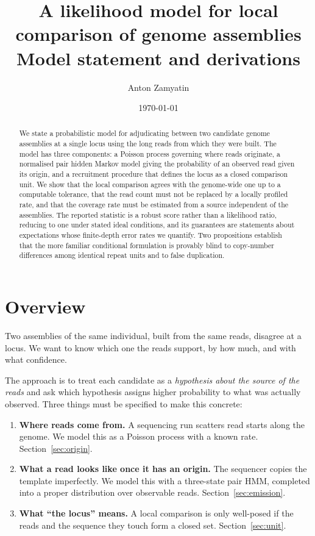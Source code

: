 \documentclass[11pt]{article}
\title{A likelihood model for local comparison of genome assemblies\\
{\large Model statement and derivations}}
\author{Anton Zamyatin}
\date{\today}
\begin{document}
\maketitle

\begin{abstract}
\noindent
We state a probabilistic model for adjudicating between two candidate genome
assemblies at a single locus using the long reads from which they were built.
The model has three components: a Poisson process governing where reads
originate, a normalised pair hidden Markov model giving the probability of an
observed read given its origin, and a recruitment procedure that defines the
locus as a closed comparison unit.  We show that the local comparison
agrees with the genome-wide one up to a computable tolerance, that the read
count must not be replaced by a locally profiled rate, and that the coverage rate must be
estimated from a source independent of the assemblies.  The reported statistic
is a robust score rather than a likelihood ratio, reducing to one under stated
ideal conditions, and its guarantees are statements about expectations whose
finite-depth error rates we quantify.  Two propositions establish that the more familiar conditional
formulation is provably blind to copy-number differences among identical
repeat units and to false duplication.
\end{abstract}

\tableofcontents

\section{Overview}

Two assemblies of the same individual, built from the same reads, disagree at a
locus.  We want to know which one the reads support, by how much, and with what
confidence.

The approach is to treat each candidate as a \emph{hypothesis about the source
of the reads} and ask which hypothesis assigns higher probability to what was
actually observed.  Three things must be specified to make this concrete:

\begin{enumerate}
    \item \textbf{Where reads come from.}  A sequencing run scatters read
          starts along the genome.  We model this as a Poisson process with a
          known rate.  Section~\ref{sec:origin}.
    \item \textbf{What a read looks like once it has an origin.}  The
          sequencer copies the template imperfectly.  We model this with a
          three-state pair HMM, completed into a proper distribution over
          observable reads.  Section~\ref{sec:emission}.
    \item \textbf{What ``the locus'' means.}  A local comparison is only
          well-posed if the reads and the sequence they touch form a closed
          set.  Section~\ref{sec:unit}.
\end{enumerate}
\end{document}
